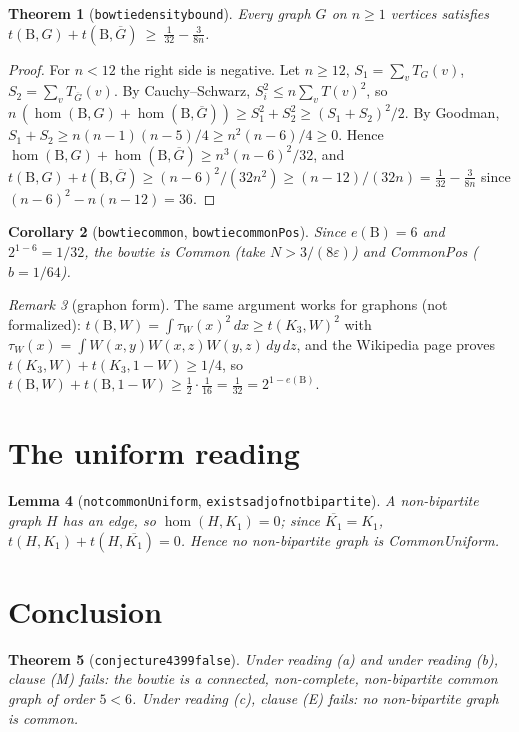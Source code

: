 \documentclass[11pt]{article}
\newtheorem{theorem}{Theorem}
\newtheorem{lemma}[theorem]{Lemma}
\newtheorem{corollary}[theorem]{Corollary}
\theoremstyle{definition}
\theoremstyle{remark}
\newtheorem{remark}[theorem]{Remark}
\renewcommand{\_}{\oldus\allowbreak}
\newcommand{\homc}{\operatorname{hom}}
\newcommand{\B}{\mathrm{B}}
\begin{document}
\begin{theorem}[\texttt{bowtie\_density\_bound}]
Every graph $G$ on $n\ge1$ vertices satisfies $t(\B,G)+t(\B,\overline G)\ \ge\ \frac1{32}-\frac{3}{8n}$.
\end{theorem}
\begin{proof}
For $n<12$ the right side is negative. Let $n\ge12$, $S_1=\sum_v T_G(v)$, $S_2=\sum_vT_{\overline G}(v)$. By
Cauchy--Schwarz, $S_i^2\le n\sum_v T(v)^2$, so
$n\,(\homc(\B,G)+\homc(\B,\overline G))\ge S_1^2+S_2^2\ge (S_1+S_2)^2/2$. By Goodman,
$S_1+S_2\ge n(n-1)(n-5)/4\ge n^2(n-6)/4\ge0$. Hence $\homc(\B,G)+\homc(\B,\overline G)\ge n^3(n-6)^2/32$, and
$t(\B,G)+t(\B,\overline G)\ge (n-6)^2/(32n^2)\ge (n-12)/(32n)=\frac1{32}-\frac3{8n}$ since
$(n-6)^2-n(n-12)=36$.
\end{proof}

\begin{corollary}[\texttt{bowtie\_common}, \texttt{bowtie\_commonPos}]
Since $e(\B)=6$ and $2^{1-6}=1/32$, the bowtie is Common (take $N>3/(8\varepsilon)$) and CommonPos ($b=1/64$).
\end{corollary}

\begin{remark}[graphon form]\label{rem:graphon}
The same argument works for graphons (not formalized): $t(\B,W)=\int\tau_W(x)^2\,dx\ge t(K_3,W)^2$ with
$\tau_W(x)=\int W(x,y)W(x,z)W(y,z)\,dy\,dz$, and the Wikipedia page proves $t(K_3,W)+t(K_3,1-W)\ge 1/4$, so
$t(\B,W)+t(\B,1-W)\ge \tfrac12\cdot\tfrac1{16}=\tfrac1{32}=2^{1-e(\B)}$.
\end{remark}

\section{The uniform reading}

\begin{lemma}[\texttt{not\_commonUniform}, \texttt{exists\_adj\_of\_not\_bipartite}]
A non-bipartite graph $H$ has an edge, so $\homc(H,K_1)=0$; since $\overline{K_1}=K_1$,
$t(H,K_1)+t(H,\overline{K_1})=0$. Hence no non-bipartite graph is CommonUniform.
\end{lemma}

\section{Conclusion}

\begin{theorem}[\texttt{conjecture4399\_false}]
Under reading (a) and under reading (b), clause (M) fails: the bowtie is a connected, non-complete, non-bipartite
common graph of order $5<6$. Under reading (c), clause (E) fails: no non-bipartite graph is common.
\end{theorem}
\end{document}
